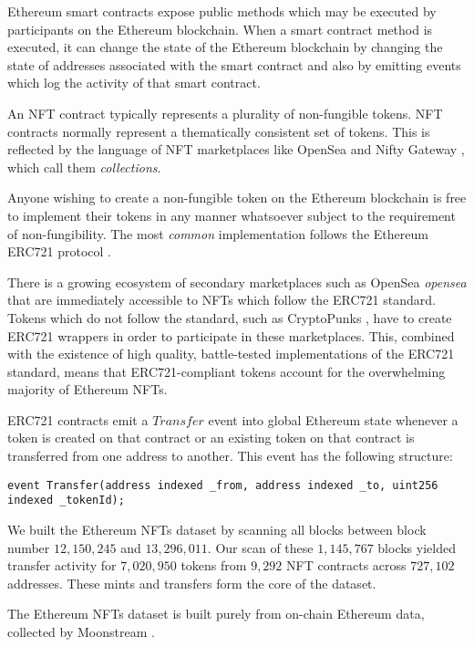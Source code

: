\documentclass{article}
\begin{document}
Ethereum smart contracts expose public methods which may be executed by participants on the Ethereum blockchain. When a smart contract method is executed, it can change the state of the Ethereum blockchain by changing the state of addresses associated with the smart contract and also by emitting events which log the activity of that smart contract.

An NFT contract typically represents a plurality of non-fungible tokens. NFT contracts normally represent a thematically consistent set of tokens. This is reflected by the language of NFT marketplaces like OpenSea \cite{opensea} and Nifty Gateway \cite{nifty}, which call them \emph{collections}.

Anyone wishing to create a non-fungible token on the Ethereum blockchain is free to implement their tokens in any manner whatsoever subject to the requirement of non-fungibility. The most \emph{common} implementation follows the Ethereum ERC721 protocol \cite{erc721}.

There is a growing ecosystem of secondary marketplaces such as OpenSea \emph{opensea} that are immediately accessible to NFTs which follow the ERC721 standard. Tokens which do not follow the standard, such as CryptoPunks \cite{cryptopunks}, have to create ERC721 wrappers in order to participate in these marketplaces. This, combined with the existence of high quality, battle-tested implementations of the ERC721 standard, means that ERC721-compliant tokens account for the overwhelming majority of Ethereum NFTs.

ERC721 contracts emit a $Transfer$ event into global Ethereum state whenever a token is created on that contract or an existing token on that contract is transferred from one address to another. This event has the following structure:

\begin{lstlisting}[caption={ERC721 Transfer event}]
event Transfer(address indexed _from, address indexed _to, uint256 indexed _tokenId);
\end{lstlisting}

We built the Ethereum NFTs dataset by scanning all blocks between block number $12,150,245$ and $13,296,011$. Our scan of these $1,145,767$ blocks yielded transfer activity for $7,020,950$ tokens from $9,292$ NFT contracts across $727,102$ addresses. These mints and transfers form the core of the dataset.

The Ethereum NFTs dataset is built purely from on-chain Ethereum data, collected by Moonstream \cite{moonstream}.
\end{document}
